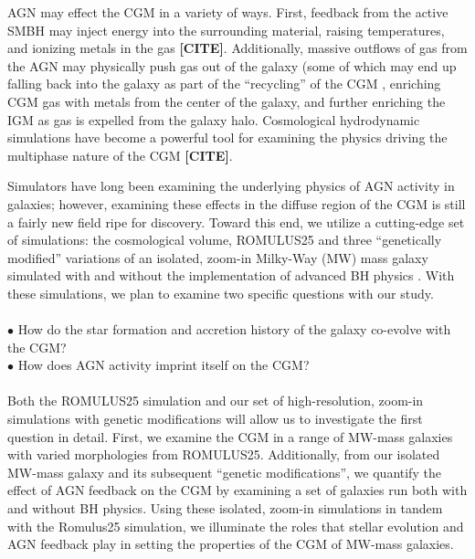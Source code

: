 \documentclass[]{emulateapj}
\begin{document}
AGN may effect the CGM in a variety of ways. First, feedback from the active SMBH may inject energy into the surrounding material, raising temperatures, and ionizing metals in the gas \textbf{[CITE]}. Additionally, massive outflows of gas from the AGN may physically push gas out of the galaxy (some of which may end up falling back into the galaxy as part of the ``recycling'' of the CGM \citep[MORE]{Tumlinson2017}, enriching CGM gas with metals from the center of the galaxy, and further enriching the IGM as gas is expelled from the galaxy halo. Cosmological hydrodynamic simulations have become a powerful tool for examining the physics driving the multiphase nature of the CGM \textbf{[CITE]}. 

Simulators have long been examining the underlying physics of AGN activity in galaxies; however, examining these effects in the diffuse region of the CGM is still a fairly new field ripe for discovery. Toward this end, we utilize a cutting-edge set of simulations: the cosmological volume, ROMULUS25 \citep{Tremmel2017} and three ``genetically modified'' variations of an isolated, zoom-in Milky-Way (MW) mass galaxy \citep{Roth2016,Pontzen2016} simulated with and without the implementation of advanced BH physics \citep{Tremmel2015}. With these simulations, we plan to examine two specific questions with our study. \\
\\
$\bullet$ How do the star formation and accretion history of the galaxy co-evolve with the CGM? \\
$\bullet$ How does AGN activity imprint itself on the CGM? \\
\\
Both the ROMULUS25 simulation and our set of high-resolution, zoom-in simulations with genetic modifications will allow us to investigate the first question in detail. First, we examine the CGM in a range of MW-mass galaxies with varied morphologies from ROMULUS25. Additionally, from our isolated MW-mass galaxy and its subsequent ``genetic modifications'', we quantify the effect of AGN feedback on the CGM by examining a set of galaxies run both with and without BH physics. Using these isolated, zoom-in simulations in tandem with the Romulus25 simulation, we illuminate the roles that stellar evolution and AGN feedback play in setting the properties of the CGM of MW-mass galaxies.
\end{document}
